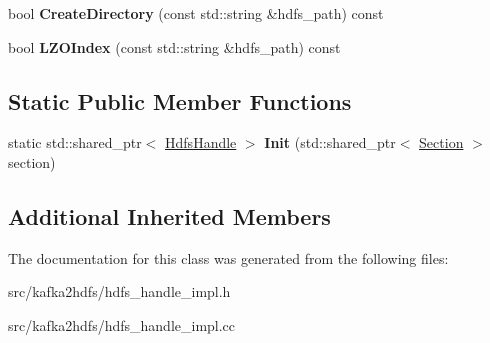\begin{DoxyCompactItemize}
\item 
bool {\bfseries Create\+Directory} (const std\+::string \&hdfs\+\_\+path) const \hypertarget{classlog2hdfs_1_1CommandHdfsHandle_a92457b8a64a98e1c9df02bb7962b0b71}{}\label{classlog2hdfs_1_1CommandHdfsHandle_a92457b8a64a98e1c9df02bb7962b0b71}

\item 
bool {\bfseries L\+Z\+O\+Index} (const std\+::string \&hdfs\+\_\+path) const \hypertarget{classlog2hdfs_1_1CommandHdfsHandle_a29cc1e78f3c6ad68f3f661f4b397afd9}{}\label{classlog2hdfs_1_1CommandHdfsHandle_a29cc1e78f3c6ad68f3f661f4b397afd9}

\end{DoxyCompactItemize}
\subsection*{Static Public Member Functions}
\begin{DoxyCompactItemize}
\item 
static std\+::shared\+\_\+ptr$<$ \hyperlink{classlog2hdfs_1_1HdfsHandle}{Hdfs\+Handle} $>$ {\bfseries Init} (std\+::shared\+\_\+ptr$<$ \hyperlink{classlog2hdfs_1_1Section}{Section} $>$ section)\hypertarget{classlog2hdfs_1_1CommandHdfsHandle_aa63d52d8d03fde4e0eaaa7beb541024e}{}\label{classlog2hdfs_1_1CommandHdfsHandle_aa63d52d8d03fde4e0eaaa7beb541024e}

\end{DoxyCompactItemize}
\subsection*{Additional Inherited Members}


The documentation for this class was generated from the following files\+:\begin{DoxyCompactItemize}
\item 
src/kafka2hdfs/hdfs\+\_\+handle\+\_\+impl.\+h\item 
src/kafka2hdfs/hdfs\+\_\+handle\+\_\+impl.\+cc\end{DoxyCompactItemize}
